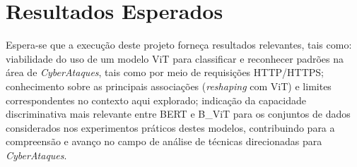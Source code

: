 \section{Resultados Esperados}

Espera-se que a execução deste projeto forneça resultados relevantes, tais como: viabilidade do uso de um modelo ViT para classificar e reconhecer padrões na área de \textit{CyberAtaques},  tais como por meio de requisições HTTP/HTTPS; conhecimento sobre as principais associações (\textit{reshaping} com ViT) e limites correspondentes no contexto aqui explorado; indicação da capacidade discriminativa mais relevante entre BERT e B\_ViT para os conjuntos de dados considerados nos experimentos práticos destes modelos, contribuindo para a compreensão e avanço no campo de análise de técnicas direcionadas para \textit{CyberAtaques}.

